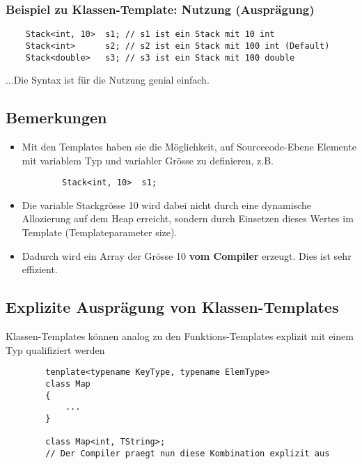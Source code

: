 \subsubsection{Beispiel zu Klassen-Template: Nutzung (Ausprägung)}
\label{sec:Beispiel zu Klassen-Template: Nutzung (Auspraegung)}
\noindent
\begin{minipage}{\linewidth}
	\begin{lstlisting}
	Stack<int, 10>	s1;	// s1 ist ein Stack mit 10 int
	Stack<int>		s2;	// s2 ist ein Stack mit 100 int (Default)
	Stack<double>	s3;	// s3 ist ein Stack mit 100 double
	\end{lstlisting}
\end{minipage}
...Die Syntax ist für die Nutzung genial einfach.

\subsection{Bemerkungen}
\label{sec:Bemerkungen}
\begin{itemize}
	\item Mit den Templates haben sie die Möglichkeit, auf Sourcecode-Ebene Elemente mit variablem Typ und variabler Grösse zu definieren, z.B.
	\noindent
	\begin{minipage}{\linewidth}
		\begin{lstlisting}
		Stack<int, 10>	s1;
		\end{lstlisting}
	\end{minipage}
	\item Die variable Stackgrösse 10 wird dabei nicht durch eine dynamische Allozierung auf dem Heap erreicht, sondern durch Einsetzen dieses Wertes im Template (Templateparameter size).
	\item Dadurch wird ein Array der Grösse 10 \textbf{vom Compiler} erzeugt. Dies ist sehr effizient.
\end{itemize}

\subsection{Explizite Ausprägung von Klassen-Templates}
\label{sec:Explizite Auspraegung von Klassen-Templates}
Klassen-Templates können analog zu den Funktions-Templates explizit mit einem Typ qualifiziert werden
\noindent
\begin{minipage}{\linewidth}
	\begin{lstlisting}
		tenplate<typename KeyType, typename ElemType>
		class Map
		{
			...
		}
		
		class Map<int, TString>;
		// Der Compiler praegt nun diese Kombination explizit aus
	\end{lstlisting}
\end{minipage}

